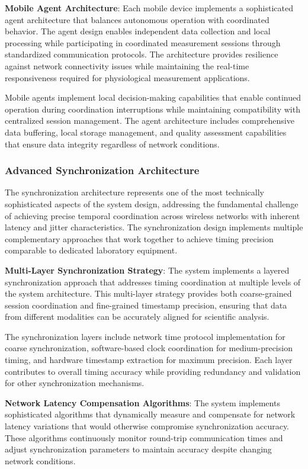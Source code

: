 \documentclass[12pt,a4paper]{article}
\begin{document}
\textbf{Mobile Agent Architecture}: Each mobile device implements a sophisticated agent architecture that balances autonomous
operation with coordinated behavior. The agent design enables independent data collection and local processing while
participating in coordinated measurement sessions through standardized communication protocols. The architecture
provides resilience against network connectivity issues while maintaining the real-time responsiveness required for
physiological measurement applications.

Mobile agents implement local decision-making capabilities that enable continued operation during coordination
interruptions while maintaining compatibility with centralized session management. The agent architecture includes
comprehensive data buffering, local storage management, and quality assessment capabilities that ensure data integrity
regardless of network conditions.

\subsubsection{Advanced Synchronization Architecture}

The synchronization architecture represents one of the most technically sophisticated aspects of the system design,
addressing the fundamental challenge of achieving precise temporal coordination across wireless networks with inherent
latency and jitter characteristics. The synchronization design implements multiple complementary approaches that work
together to achieve timing precision comparable to dedicated laboratory equipment.

\textbf{Multi-Layer Synchronization Strategy}: The system implements a layered synchronization approach that addresses timing
coordination at multiple levels of the system architecture. This multi-layer strategy provides both coarse-grained
session coordination and fine-grained timestamp precision, ensuring that data from different modalities can be
accurately aligned for scientific analysis.

The synchronization layers include network time protocol implementation for coarse synchronization, software-based clock
coordination for medium-precision timing, and hardware timestamp extraction for maximum precision. Each layer
contributes to overall timing accuracy while providing redundancy and validation for other synchronization mechanisms.

\textbf{Network Latency Compensation Algorithms}: The system implements sophisticated algorithms that dynamically measure and
compensate for network latency variations that would otherwise compromise synchronization accuracy. These algorithms
continuously monitor round-trip communication times and adjust synchronization parameters to maintain accuracy despite
changing network conditions.
\end{document}
